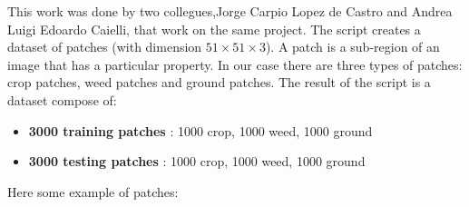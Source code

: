 \documentclass[]{report}
\begin{document}
This work was done by two collegues,Jorge Carpio Lopez de Castro and  Andrea Luigi Edoardo Caielli, that work on the same project. 
The script creates a dataset of patches (with dimension $ 51\times51\times3 $). A patch is a sub-region of an image that has a particular property. In our case there are three types of patches: crop patches, weed patches and ground patches. The result of the script is a dataset compose of:

\begin{itemize}
	\item \textbf{3000 training patches} : 1000 crop, 1000 weed, 1000 ground 
	\item \textbf{3000 testing patches} : 1000 crop, 1000 weed, 1000 ground
\end{itemize}

Here some example of patches:
\end{document}
